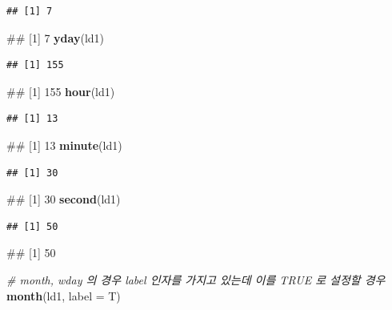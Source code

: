 \documentclass[10pt,]{krantz}
\makeatletter
\newenvironment{Shaded}{\begin{snugshade}}{\end{snugshade}}
\newcommand{\KeywordTok}[1]{\textcolor[rgb]{0.13,0.29,0.53}{\textbf{#1}}}
\newcommand{\DataTypeTok}[1]{\textcolor[rgb]{0.13,0.29,0.53}{#1}}
\newcommand{\CommentTok}[1]{\textcolor[rgb]{0.56,0.35,0.01}{\textit{#1}}}
\newcommand{\NormalTok}[1]{#1}
\newenvironment{kframe}{%
\medskip{}
\setlength{\fboxsep}{.8em}
 \def\at@end@of@kframe{}%
 \ifinner\ifhmode%
  \def\at@end@of@kframe{\end{minipage}}%
  \begin{minipage}{\columnwidth}%
 \fi\fi%
 \def\FrameCommand##1{\hskip\@totalleftmargin \hskip-\fboxsep
 \colorbox{shadecolor}{##1}\hskip-\fboxsep
     \hskip-\linewidth \hskip-\@totalleftmargin \hskip\columnwidth}%
 \MakeFramed {\advance\hsize-\width
   \@totalleftmargin\z@ \linewidth\hsize
   \@setminipage}}%
 {\par\unskip\endMakeFramed%
 \at@end@of@kframe}
\renewenvironment{Shaded}{\begin{kframe}}{\end{kframe}}
\makeatother
\begin{document}
\begin{verbatim}
## [1] 7
\end{verbatim}

\begin{Shaded}
\begin{Highlighting}[]
\NormalTok{## [1] 7}
\KeywordTok{yday}\NormalTok{(ld1)}
\end{Highlighting}
\end{Shaded}

\begin{verbatim}
## [1] 155
\end{verbatim}

\begin{Shaded}
\begin{Highlighting}[]
\NormalTok{## [1] 155}
\KeywordTok{hour}\NormalTok{(ld1)}
\end{Highlighting}
\end{Shaded}

\begin{verbatim}
## [1] 13
\end{verbatim}

\begin{Shaded}
\begin{Highlighting}[]
\NormalTok{## [1] 13}
\KeywordTok{minute}\NormalTok{(ld1)}
\end{Highlighting}
\end{Shaded}

\begin{verbatim}
## [1] 30
\end{verbatim}

\begin{Shaded}
\begin{Highlighting}[]
\NormalTok{## [1] 30}
\KeywordTok{second}\NormalTok{(ld1)}
\end{Highlighting}
\end{Shaded}

\begin{verbatim}
## [1] 50
\end{verbatim}

\begin{Shaded}
\begin{Highlighting}[]
\NormalTok{## [1] 50}

\CommentTok{# month, wday 의 경우 label 인자를 가지고 있는데 이를 TRUE 로 설정할 경우}
\KeywordTok{month}\NormalTok{(ld1, }\DataTypeTok{label =}\NormalTok{ T)}
\end{Highlighting}
\end{Shaded}
\end{document}
